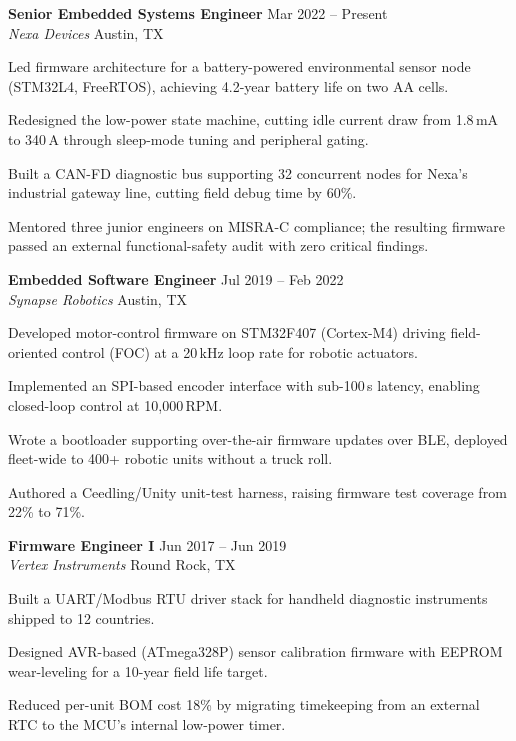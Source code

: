 \documentclass[10pt,letterpaper]{article}
\newcommand{\cvevent}[4]{%
  \textbf{\color{inkNavy}#1} \hfill {\color{slateGray}\small #4}\\
  \textit{\color{circuitTeal}#2} \hfill {\small\color{slateGray}#3}\\[1pt]
}
\begin{document}
\cvevent{Senior Embedded Systems Engineer}{Nexa Devices}{Austin, TX}{Mar 2022 -- Present}
\begin{tightitem}
  \item Led firmware architecture for a battery-powered environmental sensor node (STM32L4, FreeRTOS), achieving 4.2-year battery life on two AA cells.
  \item Redesigned the low-power state machine, cutting idle current draw from 1.8\,mA to 340\,\textmu A through sleep-mode tuning and peripheral gating.
  \item Built a CAN-FD diagnostic bus supporting 32 concurrent nodes for Nexa's industrial gateway line, cutting field debug time by 60\%.
  \item Mentored three junior engineers on MISRA-C compliance; the resulting firmware passed an external functional-safety audit with zero critical findings.
\end{tightitem}

\vspace{1.5pt}
\cvevent{Embedded Software Engineer}{Synapse Robotics}{Austin, TX}{Jul 2019 -- Feb 2022}
\begin{tightitem}
  \item Developed motor-control firmware on STM32F407 (Cortex-M4) driving field-oriented control (FOC) at a 20\,kHz loop rate for robotic actuators.
  \item Implemented an SPI-based encoder interface with sub-100\,\textmu s latency, enabling closed-loop control at 10{,}000\,RPM.
  \item Wrote a bootloader supporting over-the-air firmware updates over BLE, deployed fleet-wide to 400+ robotic units without a truck roll.
  \item Authored a Ceedling/Unity unit-test harness, raising firmware test coverage from 22\% to 71\%.
\end{tightitem}

\vspace{1.5pt}
\cvevent{Firmware Engineer I}{Vertex Instruments}{Round Rock, TX}{Jun 2017 -- Jun 2019}
\begin{tightitem}
  \item Built a UART/Modbus RTU driver stack for handheld diagnostic instruments shipped to 12 countries.
  \item Designed AVR-based (ATmega328P) sensor calibration firmware with EEPROM wear-leveling for a 10-year field life target.
  \item Reduced per-unit BOM cost 18\% by migrating timekeeping from an external RTC to the MCU's internal low-power timer.
\end{tightitem}
\end{document}
